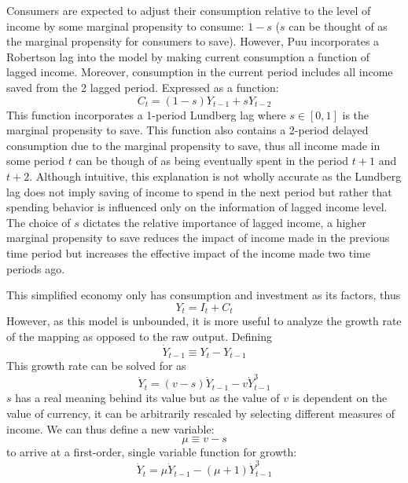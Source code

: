 Consumers are expected to adjust their consumption relative to the level of income by some marginal propensity to consume: $1-s$ ($s$ can be thought of as the marginal propensity for consumers to save). However, Puu incorporates a Robertson lag into the model by making current consumption a function of lagged income. Moreover, consumption in the current period includes all income saved from the 2 lagged period. Expressed as a function:
\begin{equation}
    C_t = (1-s)Y_{t-1}+sY_{t-2}
\end{equation}
This function incorporates a 1-period Lundberg lag where $s\in[0,1]$ is the marginal propensity to save. This function also contains a 2-period delayed consumption due to the marginal propensity to save, thus all income made in some period $t$ can be though of as being eventually spent in the period $t+1$ and $t+2$. Although intuitive, this explanation is not wholly accurate as the Lundberg lag does not imply saving of income to spend in the next period but rather that spending behavior is influenced only on the information of lagged income level. The choice of $s$ dictates the relative importance of lagged income, a higher marginal propensity to save reduces the impact of income made in the previous time period but increases the effective impact of the income made two time periods ago.  

This simplified economy only has consumption and investment as its factors, thus
\begin{equation}
    Y_t=I_t+C_t
\end{equation}
However, as this model is unbounded, it is more useful to analyze the growth rate of the mapping as opposed to the raw output. Defining 
\begin{equation}
    \dot Y_{t-1}\equiv Y_t-Y_{t-1}
\end{equation}
This growth rate can be solved for as
\begin{equation*}
    \dot Y_t=(v-s)\dot Y_{t-1}-v\dot Y_{t-1}^3
\end{equation*}
$s$ has a real meaning behind its value but as the value of $v$ is dependent on the value of currency, it can be arbitrarily rescaled by selecting different measures of income. We can thus define a new variable:
\begin{equation*}
    \mu\equiv v-s
\end{equation*}
to arrive at a first-order, single variable function for growth:
\begin{equation}
    \dot Y_t=\mu \dot Y_{t-1}-(\mu+1)\dot Y_{t-1}^3
\end{equation}

